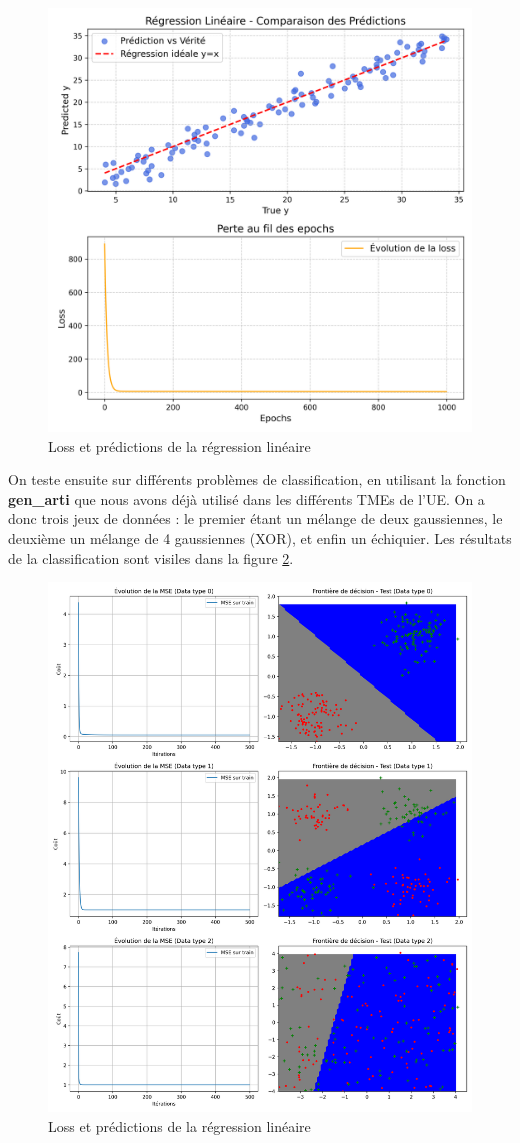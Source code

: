 \documentclass{article}
\begin{document}
\begin{figure}[H]
    \centering
    \includegraphics[width=0.8\linewidth]{Images/regression_lineaire.png}
    \caption{Loss et prédictions de la régression linéaire}
	\label{fig:res_reg_lin}
\end{figure}

On teste ensuite sur différents problèmes de classification, en utilisant la fonction \textbf{gen\_arti} que nous avons déjà utilisé dans les différents TMEs de l'UE. On a donc trois jeux de données : le premier étant un mélange de deux gaussiennes, le deuxième un mélange de 4 gaussiennes (XOR), et enfin un échiquier. Les résultats de la classification sont visiles dans la figure \ref{fig:res_classif_reg_lin}.

\begin{figure}[H]
    \centering
    \includegraphics[width=0.8\linewidth]{Images/classif_reg_lineaire.png}
    \caption{Loss et prédictions de la régression linéaire}
	\label{fig:res_classif_reg_lin}
\end{figure}
\end{document}
